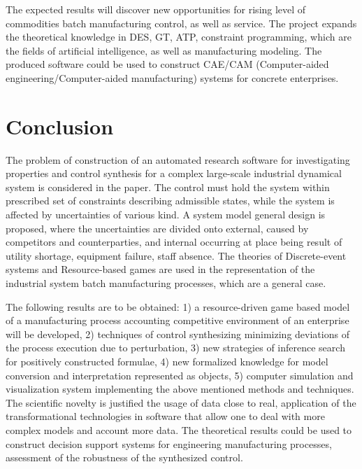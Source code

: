 \documentclass[conference,a4paper]{IEEEtran}
\begin{document}
The expected results will discover new opportunities for rising level of commodities batch manufacturing control, as well as service. The project expands the theoretical knowledge in DES, GT, ATP, constraint programming, which are the fields of artificial intelligence, as well as manufacturing modeling. The produced software could be used to construct CAE/CAM (Computer-aided engineering/Computer-aided manufacturing) systems for concrete enterprises.

\section{Conclusion}
\label{sec:conc}

The problem of construction of an automated research software for investigating properties and control synthesis for a complex large-scale industrial dynamical system is considered in the paper.  The control must hold the system within prescribed set of constraints describing admissible states, while the system is affected by uncertainties of various kind.  A system model general design is proposed, where the uncertainties are divided onto external, caused by competitors and counterparties, and internal occurring at place being result of utility shortage, equipment failure, staff absence.  The theories of Discrete-event systems and Resource-based games are used in the representation of the industrial system batch manufacturing processes, which are a general case.

The following results are to be obtained: 1) a resource-driven game based model of a manufacturing process accounting competitive environment of an enterprise will be developed, 2) techniques of control synthesizing minimizing deviations of the process execution due to perturbation, 3) new strategies of inference search for positively constructed formulae, 4) new formalized knowledge for model conversion and interpretation represented as objects, 5) computer simulation and visualization system implementing the above mentioned methods and techniques. The scientific novelty is justified the usage of data close to real, application of the transformational technologies in software that allow one to deal with more complex models and account more data. The theoretical results could be used to construct decision support systems for engineering manufacturing processes, assessment of the robustness of the synthesized control.
\end{document}

